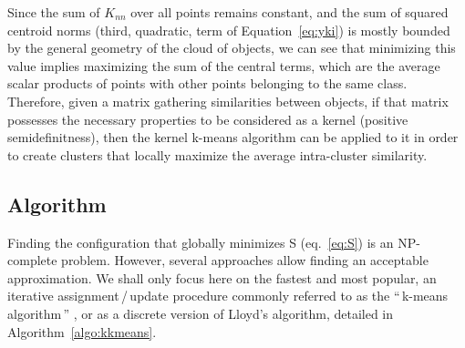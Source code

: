 \documentclass[natbib,smallextended]{svjour3}
\newcommand{\gl}[1]{``\,#1\,''} %
\begin{document}


Since the sum of $K_{nn}$ over all points remains constant, and the sum of squared centroid norms (third, quadratic, term of Equation~\ref{eq:yki}) is mostly bounded by the general geometry of the cloud of objects, we can see that minimizing this value implies maximizing the sum of the central terms, which are the average scalar products of points with other points belonging to the same class. Therefore, given a matrix gathering similarities between objects, if that matrix possesses the necessary properties to be considered as a kernel (positive semidefinitness), then the kernel k-means algorithm can be applied to it in order to create clusters that locally maximize the average intra-cluster similarity.

\subsection{Algorithm}

Finding the configuration that globally minimizes S (eq.~\ref{eq:S}) is an NP-complete problem. However, several approaches allow finding an acceptable approximation. We shall only focus here on the fastest and most popular, an iterative assignment\,/\,update procedure commonly referred to as the \gl{k-means algorithm} \citep{macQueenBsmsp67}, or as a discrete version of Lloyd's algorithm, detailed in Algorithm~\ref{algo:kkmeans}.
\end{document}
